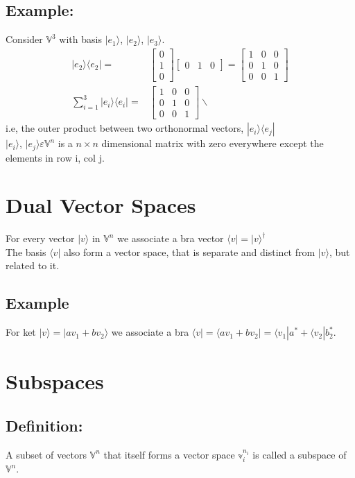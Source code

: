 \documentclass[12pt]{article}
\begin{document}
\subsection*{Example:}
Consider $\mathbb{V}^3$ with basis $|e_1\rangle$, $|e_2\rangle$, $|e_3\rangle$.
\begin{align*}
|e_2\rangle\langle e_2| =&
\begin{bmatrix}
0\\1\\0
\end{bmatrix}
\begin{bmatrix}
0&1&0
\end{bmatrix}
=
\begin{bmatrix}
1&0&0\\
0&1&0\\
0&0&1
\end{bmatrix}
\\
\sum_{i=1}^3 |e_i\rangle\langle e_i| =& 
\begin{bmatrix}
1&0&0\\
0&1&0\\
0&0&1
\end{bmatrix}\backslash
\end{align*}
i.e, the outer product between two orthonormal vectors, $|e_i\rangle\langle e_j|$\\
$|e_i\rangle$, $|e_j\rangle \varepsilon \mathbb{V}^n$ is a $n\times n$ dimensional matrix with zero everywhere except the elements in row i, col j.

\section{Dual Vector Spaces}
For every vector $|v\rangle$ in $\mathbb{V}^n$ we associate a bra vector $\langle v| = |v\rangle^\dagger$\\
The basis $\langle v|$ also form a vector space, that is separate and distinct from $|v\rangle$, but related to it. 
\subsection*{Example}
For ket $|v\rangle = |av_1 + bv_2\rangle$ we associate a bra $\langle v| = \langle av_1 + bv_2| = \langle v_1|a^*+\langle v_2|b_2^*$.

\section{Subspaces}
\subsection*{Definition:}
A subset of vectors $\mathbb{V}^n$ that itself forms a vector space $\mathbb{v}_i^{n_i}$ is called a subspace of $\mathbb{V}^n$.
\end{document}
